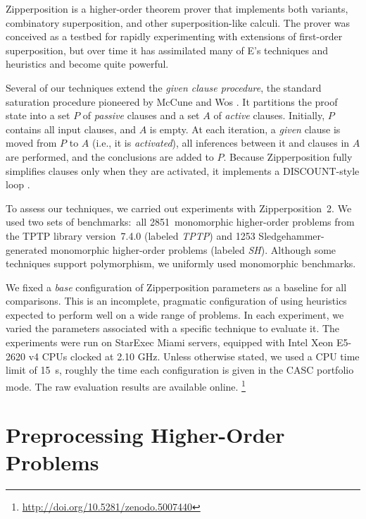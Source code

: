 \documentclass[smallcondensed,draft]{svjour3}     %
\begin{document}
Zipperposition \cite{sc-15-simon-phd,bbtvw-21-sup-lam} is a higher-order
theorem prover that implements both \lsup{} variants, combinatory
superposition, and other superposition-like calculi.
The prover was conceived as a testbed for rapidly
experimenting with extensions of first-order superposition, but over time it
has assimilated many of E's techniques and heuristics and become quite powerful.

Several of our techniques extend the \emph{given clause procedure}, the standard
saturation procedure pioneered by McCune and Wos \cite[Sect.~2.3]{mcw-1997-otter}. It partitions the proof
state into a set $P$ of \emph{passive} clauses and a set $A$ of \emph{active}
clauses. Initially, $P$ contains all input clauses, and $A$ is empty. At each
iteration, a \emph{given} clause is moved from $P$ to $A$ (i.e., it is
\emph{activated}), all inferences between it and clauses in $A$ are performed,
and the conclusions are added to $P$. Because Zipperposition fully simplifies
clauses only when they are activated, it implements a DISCOUNT-style loop
\cite{adf-1995-discount}.

To assess our techniques, we carried out experiments with Zipperposition~2. We
used two sets of benchmarks:\ all 2851~monomorphic higher-order problems from the
TPTP library \cite{gs-17-tptp} version~7.4.0 (labeled \emph{TPTP})
and 1253 Sledgehammer-generated
monomorphic higher-order problems (labeled \emph{SH}).
Although some techniques support polymorphism, we
uniformly used monomorphic benchmarks.

We fixed a \emph{base} configuration
of Zipperposition parameters as a baseline for all comparisons. This is an
incomplete, pragmatic configuration of \osup{} using heuristics expected to perform
well on a wide range of problems.
In each experiment, we varied
the parameters associated with a specific technique to evaluate it. The
experiments were run on StarExec Miami \cite{sst-14-starexec} servers, equipped with
Intel Xeon E5-2620 v4 CPUs clocked at 2.10 GHz. Unless otherwise stated, we used a
CPU time limit of 15~s, roughly the time each configuration is given in the
CASC portfolio mode. The raw evaluation results are available online.%
\footnote{\url{http://doi.org/10.5281/zenodo.5007440}}


\section{Preprocessing Higher-Order Problems}
\label{sec:ho-tech:preprocessing}
\end{document}
